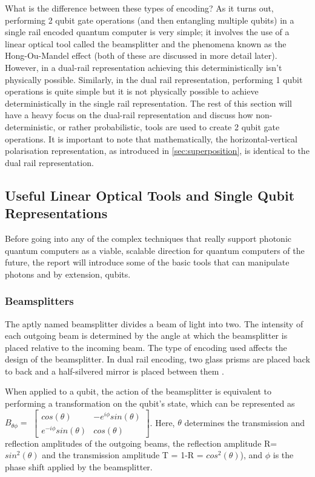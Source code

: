 What is the difference between these types of encoding? As it turns out, performing 2 qubit gate operations (and then entangling multiple qubits) in a single rail encoded quantum computer is very simple; it involves the use of a linear optical tool called the beamsplitter and the phenomena known as the Hong-Ou-Mandel effect \cite{PhysRevLett.59.2044}(both of these are discussed in more detail later). However, in a dual-rail representation achieving this deterministically isn't physically possible. Similarly, in the dual rail representation, performing 1 qubit operations is quite simple but it is not physically possible to achieve deterministically in the single rail representation. The rest of this section will have a heavy focus on the dual-rail representation and discuss how non-deterministic, or rather probabilistic, tools are used to create 2 qubit gate operations. It is important to note that mathematically, the horizontal-vertical polarisation representation, as introduced in \cref{sec:superposition}, is identical to the dual rail representation. 



\subsection{Useful Linear Optical Tools and Single Qubit Representations}
Before going into any of the complex techniques that really support photonic quantum computers as a viable, scalable direction for quantum computers of the future, the report will introduce some of the basic tools that can manipulate photons and by extension, qubits.
\subsubsection{Beamsplitters}

The aptly named beamsplitter divides a beam of light into two. The intensity of each outgoing beam is determined by the angle at which the beamsplitter is placed relative to the incoming beam. The type of encoding used affects the design of the beamsplitter. In dual rail encoding, two glass prisms are placed back to back and a half-silvered mirror is placed between them \cite{nielsen_chuang_2010}. %

When applied to a qubit, the action of the beamsplitter is equivalent to performing a transformation on the qubit's state, which can be represented as $B_{\theta\phi} = $ $\begin{bmatrix}
cos(\theta) & -e^{i\phi}sin(\theta) \\
e^{-i\phi}sin(\theta) & cos(\theta) 
\end{bmatrix}$. \cite{KnillE2001Asfe} Here, $\theta$ determines the transmission and reflection amplitudes of the outgoing beams, the reflection amplitude R= $sin^2(\theta)$ and the transmission amplitude T = 1-R = $cos^2(\theta)$), and $\phi$ is the phase shift applied by the beamsplitter.

